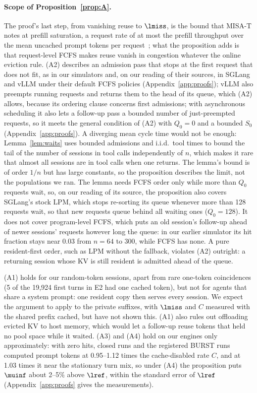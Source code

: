 \paragraph{Scope of Proposition~\ref{prop:A}.} The proof's last step, from vanishing reuse to $\lmiss$, is the bound that MISA-T notes at prefill saturation, a request rate of at most the prefill throughput over the mean uncached prompt tokens per request~\citep{hong2026misat}; what the proposition adds is that request-level FCFS makes reuse vanish in congestion whatever the online eviction rule. (A2) describes an admission pass that stops at the first request that does not fit, as in our simulators and, on our reading of their sources, in SGLang and vLLM under their default FCFS policies (Appendix~\ref{app:proofs}); vLLM also preempts running requests and returns them to the head of its queue, which (A2) allows, because its ordering clause concerns first admissions; with asynchronous scheduling it also lets a follow-up pass a bounded number of just-preempted requests, so it meets the general condition of (A2) with $Q_0=0$ and a bounded $S_0$ (Appendix~\ref{app:proofs}). A diverging mean cycle time would not be enough: Lemma~\ref{lem:waits} uses bounded admissions and i.i.d.\ tool times to bound the tail of the number of sessions in tool calls independently of $n$, which makes it rare that almost all sessions are in tool calls when one returns. The lemma's bound is of order $1/n$ but has large constants, so the proposition describes the limit, not the populations we ran. The lemma needs FCFS order only while more than $Q_0$ requests wait, so, on our reading of its source, the proposition also covers SGLang's stock LPM, which stops re-sorting its queue whenever more than 128 requests wait, so that new requests queue behind all waiting ones ($Q_0=128$). It does not cover program-level FCFS, which puts an old session's follow-up ahead of newer sessions' requests however long the queue: in our earlier simulator its hit fraction stays near 0.03 from $n=64$ to 300, while FCFS has none. A pure resident-first order, such as LPM without the fallback, violates (A2) outright: a returning session whose KV is still resident is admitted ahead of the queue.

(A1) holds for our random-token sessions, apart from rare one-token coincidences (5 of the 19,924 first turns in E2 had one cached token), but not for agents that share a system prompt: one resident copy then serves every session. We expect the argument to apply to the private suffixes, with $\lmiss$ and $C$ measured with the shared prefix cached, but have not shown this. (A1) also rules out offloading evicted KV to host memory, which would let a follow-up reuse tokens that held no pool space while it waited. (A3) and (A4) hold on our engines only approximately: with zero hits, closed runs and the registered BURST runs computed prompt tokens at 0.95--1.12 times the cache-disabled rate $C$, and at 1.03 times it near the stationary turn mix, so under (A4) the proposition puts $\muinf$ about 2--5\% above $\lref$, within the standard error of $\lref$ (Appendix~\ref{app:proofs} gives the measurements).

